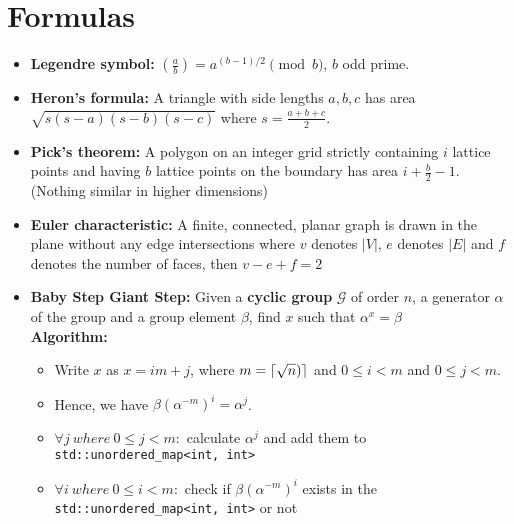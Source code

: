 \documentclass[12pt,a4paper,landscape]{amsart}
\DeclarePairedDelimiter{\ceil}{\lceil}{\rceil}
\begin{document}
\begin{multicols*}{3}
\end{multicols*}
\clearpage
\section{Formulas}


\begin{multicols*}{3}
	
\begin{itemize}
	\item \textbf{Legendre symbol:} $\left(\frac{a}{b}\right) = a^{(b-1)/2} \pmod{b}$, $b$ odd prime.
	\item \textbf{Heron's formula:} A triangle with side lengths
	$a,b,c$ has area $\sqrt{s(s-a)(s-b)(s-c)}$ where $s =
	\frac{a+b+c}{2}$.
	\item \textbf{Pick's theorem:} A polygon on an integer grid
	strictly containing $i$ lattice points and having $b$ lattice
	points on the boundary has area $i + \frac{b}{2} - 1$. (Nothing
	similar in higher dimensions)
	\item \textbf{Euler characteristic:} A finite, connected, planar graph is drawn in the plane without any edge intersections where $v$ denotes $|V|$, $e$ denotes $|E|$ and $f$ denotes the number of faces, then $v - e + f = 2$
	\item \textbf{Baby Step Giant Step:} Given a \textbf{cyclic group} $\mathcal{G}$ of order $n$, a generator $\alpha$ of the group and a group element $\beta$, find $x$ such that $\alpha^x = \beta$\\
		\textbf{Algorithm: }\begin{itemize}[leftmargin=*]
			\item Write $x$ as $x = im + j$, where $m = \ceil{\sqrt{n})}$ and $0 \leq i < m$ and $0 \leq j < m$.
			\item Hence, we have $\beta(\alpha^{-m})^{i} = \alpha^j$.
			\item $\forall j\ where\ 0 \leq j < m:$ calculate $\alpha^j$ and add them to \verb!std::unordered_map<int, int>!
			\item $\forall i\ where\ 0 \leq i < m:$ check if $\beta(\alpha^{-m})^{i}$ exists in the \verb|std::unordered_map<int, int>| or not

\end{itemize}
\end{itemize}
\end{multicols*}
\end{document}
